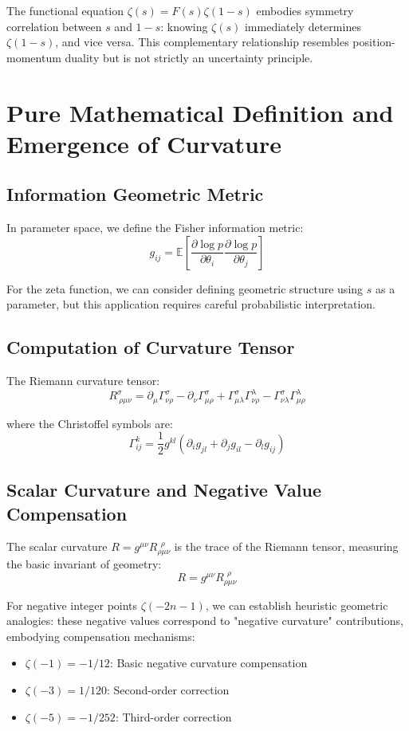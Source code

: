 \documentclass[11pt]{article}
\begin{document}
The functional equation $\zeta(s) = F(s) \zeta(1-s)$ embodies symmetry correlation between $s$ and $1-s$: knowing $\zeta(s)$ immediately determines $\zeta(1-s)$, and vice versa. This complementary relationship resembles position-momentum duality but is not strictly an uncertainty principle.

\section{Pure Mathematical Definition and Emergence of Curvature}

\subsection{Information Geometric Metric}

In parameter space, we define the Fisher information metric:
$$g_{ij} = \mathbb{E}\left[\frac{\partial \log p}{\partial \theta_i} \frac{\partial \log p}{\partial \theta_j}\right]$$

For the zeta function, we can consider defining geometric structure using $s$ as a parameter, but this application requires careful probabilistic interpretation.

\subsection{Computation of Curvature Tensor}

The Riemann curvature tensor:
$$R^{\sigma}_{\ \rho\mu\nu} = \partial_{\mu} \Gamma^{\sigma}_{\nu\rho} - \partial_{\nu} \Gamma^{\sigma}_{\mu\rho} + \Gamma^{\sigma}_{\mu\lambda} \Gamma^{\lambda}_{\nu\rho} - \Gamma^{\sigma}_{\nu\lambda} \Gamma^{\lambda}_{\mu\rho}$$

where the Christoffel symbols are:
$$\Gamma^k_{ij} = \frac{1}{2} g^{kl} \left(\partial_i g_{jl} + \partial_j g_{il} - \partial_l g_{ij}\right)$$

\subsection{Scalar Curvature and Negative Value Compensation}

The scalar curvature $R = g^{\mu\nu}R_{\rho\mu\nu}^{\ \ \rho}$ is the trace of the Riemann tensor, measuring the basic invariant of geometry:
$$R = g^{\mu\nu} R_{\rho\mu\nu}^{\ \ \rho}$$

For negative integer points $\zeta(-2n-1)$, we can establish heuristic geometric analogies: these negative values correspond to "negative curvature" contributions, embodying compensation mechanisms:
\begin{itemize}
\item $\zeta(-1) = -1/12$: Basic negative curvature compensation
\item $\zeta(-3) = 1/120$: Second-order correction
\item $\zeta(-5) = -1/252$: Third-order correction
\end{itemize}
\end{document}
